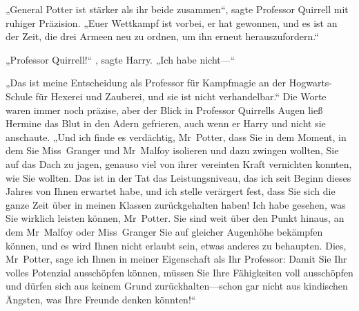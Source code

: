 „General Potter ist stärker als ihr beide zusammen“, sagte Professor Quirrell mit ruhiger Präzision. „Euer Wettkampf ist vorbei, er hat gewonnen, und es ist an der Zeit, die drei Armeen neu zu ordnen, um ihn erneut herauszufordern.“

„Professor Quirrell!“ , sagte Harry. „Ich habe nicht—“

„Das ist meine Entscheidung als Professor für Kampfmagie an der Hogwarts-Schule für Hexerei und Zauberei, und sie ist nicht verhandelbar.“ Die Worte waren immer noch präzise, aber der Blick in Professor Quirrells Augen ließ Hermine das Blut in den Adern gefrieren, auch wenn er Harry und nicht sie anschaute. „Und ich finde es verdächtig, Mr~Potter, dass Sie in dem Moment, in dem Sie Miss~Granger und Mr~Malfoy isolieren und dazu zwingen wollten, Sie auf das Dach zu jagen, genauso viel von ihrer vereinten Kraft vernichten konnten, wie Sie wollten. Das ist in der Tat das Leistungsniveau, das ich seit Beginn dieses Jahres von Ihnen erwartet habe, und ich stelle verärgert fest, dass Sie sich die ganze Zeit über in meinen Klassen zurückgehalten haben! Ich habe gesehen, was Sie wirklich leisten können, Mr~Potter. Sie sind weit über den Punkt hinaus, an dem Mr~Malfoy oder Miss~Granger Sie auf gleicher Augenhöhe bekämpfen können, und es wird Ihnen nicht erlaubt sein, etwas anderes zu behaupten. Dies, Mr~Potter, sage ich Ihnen in meiner Eigenschaft als Ihr Professor: Damit Sie Ihr volles Potenzial ausschöpfen können, müssen Sie Ihre Fähigkeiten voll ausschöpfen und dürfen sich aus keinem Grund zurückhalten—schon gar nicht aus kindischen Ängsten, was Ihre Freunde denken könnten!“

